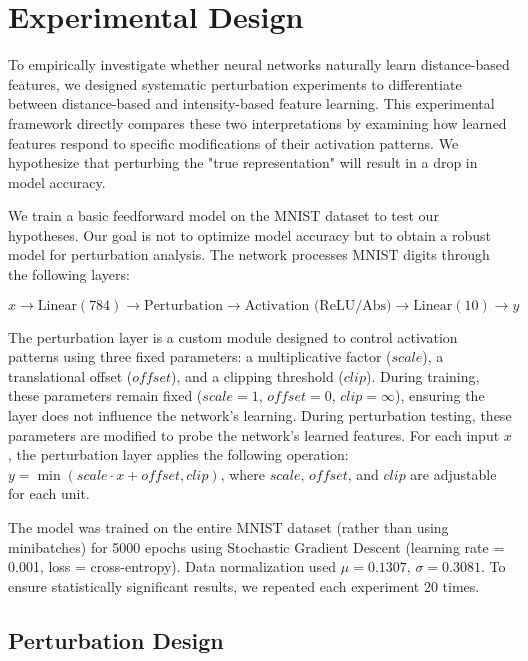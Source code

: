\section{Experimental Design}

To empirically investigate whether neural networks naturally learn distance-based features, we designed systematic perturbation experiments to differentiate between distance-based and intensity-based feature learning. This experimental framework directly compares these two interpretations by examining how learned features respond to specific modifications of their activation patterns. We hypothesize that perturbing the "true representation" will result in a drop in model accuracy. 

We train a basic feedforward model on the MNIST dataset to test our hypotheses. Our goal is not to optimize model accuracy but to obtain a robust model for perturbation analysis. The network processes MNIST digits through the following layers:

\begin{equation}
    x \rightarrow \text{Linear}(784) \rightarrow \text{Perturbation} \rightarrow \text{Activation (ReLU/Abs)} \rightarrow \text{Linear}(10) \rightarrow y
\end{equation}
 
The perturbation layer is a custom module designed to control activation patterns using three fixed parameters: a multiplicative factor ($scale$), a translational offset ($offset$), and a clipping threshold ($clip$). During training, these parameters remain fixed ($scale = 1$, $offset = 0$, $clip = \infty$), ensuring the layer does not influence the network's learning. During perturbation testing, these parameters are modified to probe the network's learned features. For each input $x$, the perturbation layer applies the following operation: $y = \min(scale \cdot x + offset, clip)$, where $scale$, $offset$, and $clip$ are adjustable for each unit.

The model was trained on the entire MNIST dataset (rather than using minibatches) for 5000 epochs using Stochastic Gradient Descent (learning rate = 0.001, loss = cross-entropy). Data normalization used $\mu=0.1307$, $\sigma=0.3081$. To ensure statistically significant results, we repeated each experiment 20 times.
\subsection{Perturbation Design}

